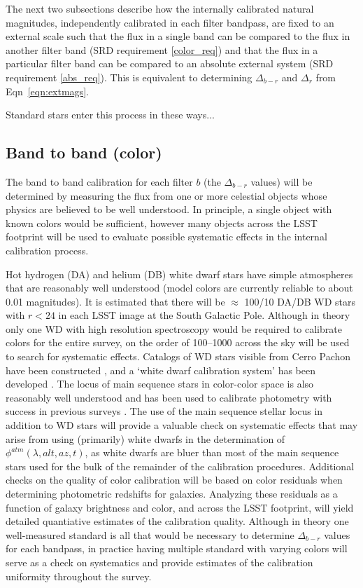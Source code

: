 \documentclass[12pt,preprint]{aastex}
\begin{document}
The next two subsections describe how the internally calibrated
natural magnitudes, independently calibrated in each filter bandpass, are fixed
to an external scale such that the flux in a single band can be compared to the
flux in another filter band (SRD requirement \ref{color_req}) and that
the flux in a particular filter band can be compared to an absolute
external system (SRD requirement \ref{abs_req}). This is equivalent to
determining $\Delta_{b-r}$ and $\Delta_r$ from Eqn~\ref{eqn:extmags}. 

Standard stars enter this process in these ways...

\subsection{Band to band (color)}

The band to band calibration for each filter $b$ (the $\Delta_{b-r}$
values) will be determined by measuring the flux from one or more
celestial objects whose physics are believed to be well
understood. In principle, a single object with known colors would be
sufficient, however many objects across the LSST footprint
will be used to evaluate possible systematic effects in the internal
calibration process. 

Hot hydrogen (DA) and helium (DB) white dwarf stars have simple
atmospheres that are reasonably well understood (model colors are
currently reliable to about 0.01 magnitudes). It is estimated that
there will be $\approx$ 100/10 DA/DB WD stars with $r<24$ in each LSST
image at the South Galactic Pole. Although in theory only one WD
with high resolution spectroscopy would be
required to calibrate colors for the entire survey, on the order of
100--1000 across the sky will be used to search for systematic effects.
Catalogs of WD stars visible from Cerro Pachon have been constructed
\citep{1992JRASC..86..309B, 2004AJ....128.3053B}, and a `white dwarf
calibration system' has been developed
\citep{2006AJ....132.1221H}. The locus of main sequence stars in
color-color space is also reasonably well understood and has been used
to calibrate photometry with success in previous surveys
\citep{2004MNRAS.352.1255M, Ivezic2007}. The use of the main
sequence stellar locus in addition to WD stars will provide a valuable
check on systematic effects that may arise from using (primarily)
white dwarfs in the determination of $\phi^{atm}(\lambda,alt,az,t)$,
as white dwarfs are bluer than most of the main sequence stars used
for the bulk of the remainder of the calibration procedures.
Additional checks on the quality of color calibration will be based on
color residuals when determining photometric redshifts for
galaxies. Analyzing these residuals as a function of galaxy brightness
and color, and across the LSST footprint, will yield detailed
quantiative estimates of the calibration quality.  Although in theory
one well-measured standard is all that would be necessary to determine
$\Delta_{b-r}$ values for each bandpass, in practice having multiple
standard with varying colors will serve as a check on systematics and
provide estimates of the calibration uniformity throughout the survey.
\end{document}

